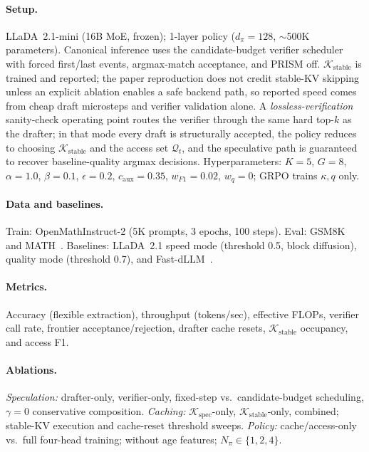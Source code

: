\documentclass[11pt]{article}
\newcommand{\cK}{\mathcal{K}}
\newcommand{\cQ}{\mathcal{Q}}
\begin{document}
\paragraph{Setup.}  LLaDA~2.1-mini (16B MoE, frozen); 1-layer policy ($d_\pi{=}128$, ${\sim}$500K parameters).
Canonical inference uses the candidate-budget verifier scheduler with forced first/last events, argmax-match acceptance, and PRISM off.
$\cK_{\text{stable}}$ is trained and reported; the paper reproduction does not credit stable-KV skipping unless an explicit ablation enables a safe backend path, so reported speed comes from cheap draft microsteps and verifier validation alone.
A \emph{lossless-verification} sanity-check operating point routes the verifier through the same hard top-$k$ as the drafter; in that mode every draft is structurally accepted, the policy reduces to choosing $\cK_{\text{stable}}$ and the access set $\cQ_t$, and the speculative path is guaranteed to recover baseline-quality argmax decisions.
Hyperparameters: $K{=}5$, $G{=}8$, $\alpha{=}1.0$, $\beta{=}0.1$, $\epsilon{=}0.2$, $c_{\text{aux}}{=}0.35$, $w_{F1}{=}0.02$, $w_q{=}0$; GRPO trains $\kappa, q$ only.

\paragraph{Data and baselines.}  Train: OpenMathInstruct-2 (5K prompts, 3 epochs, 100 steps).  Eval: GSM8K~\cite{cobbe2021gsm8k} and MATH~\cite{hendrycks2021math}.  Baselines: LLaDA~2.1 speed mode (threshold 0.5, block diffusion), quality mode (threshold 0.7), and Fast-dLLM~\cite{wu2025fastdllm}.

\paragraph{Metrics.}  Accuracy (flexible extraction), throughput (tokens/sec), effective FLOPs, verifier call rate, frontier acceptance/rejection, drafter cache resets, $\cK_{\text{stable}}$ occupancy, and access F1.

\paragraph{Ablations.}
\emph{Speculation:} drafter-only, verifier-only, fixed-step vs.\ candidate-budget scheduling, $\gamma{=}0$ conservative composition.
\emph{Caching:} $\cK_{\text{spec}}$-only, $\cK_{\text{stable}}$-only, combined; stable-KV execution and cache-reset threshold sweeps.
\emph{Policy:} cache/access-only vs.\ full four-head training; without age features; $N_\pi \in \{1,2,4\}$.
\end{document}
